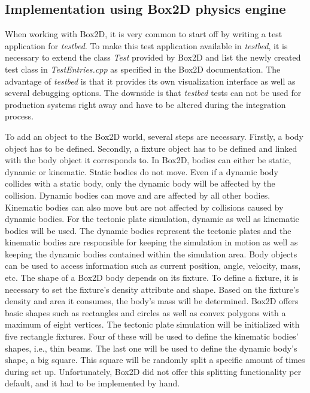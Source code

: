 \documentclass[11pt,a4paper,twoside,openright]{report}
\begin{document}
\subsection{Implementation using Box2D physics engine}
\label{subsec:implbox2d}
When working with Box2D, it is very common to start off by writing a test application for \emph{testbed}. To make this test application available in \emph{testbed}, it is necessary to extend the class \emph{Test} provided by Box2D and list the newly created test class in \emph{TestEntries.cpp} as specified in the Box2D documentation. The advantage of \emph{testbed} is that it provides its own visualization interface as well as several debugging options. The downside is that \emph{testbed} tests can not be used for production systems right away and have to be altered during the integration process.

To add an object to the Box2D world, several steps are necessary. Firstly, a body object has to be defined. Secondly, a fixture object has to be defined and linked with the body object it corresponds to. In Box2D, bodies can either be static, dynamic or kinematic. Static bodies do not move. Even if a dynamic body collides with a static body, only the dynamic body will be affected by the collision. Dynamic bodies can move and are affected by all other bodies. Kinematic bodies can also move but are not affected by collisions caused by dynamic bodies. For the tectonic plate simulation, dynamic as well as kinematic bodies will be used. The dynamic bodies represent the tectonic plates and the kinematic bodies are responsible for keeping the simulation in motion as well as keeping the dynamic bodies contained within the simulation area. Body objects can be used to access information such as current position, angle, velocity, mass, etc. The shape of a Box2D body depends on its fixture. To define a fixture, it is necessary to set the fixture's density attribute and shape. Based on the fixture's density and area it consumes, the body's mass will be determined. Box2D offers basic shapes such as rectangles and circles as well as convex polygons with a maximum of eight vertices. The tectonic plate simulation will be initialized with five rectangle fixtures. Four of these will be used to define the kinematic bodies' shapes, i.e., thin beams. The last one will be used to define the dynamic body's shape, a big square. This square will be randomly split a specific amount of times during set up. Unfortunately, Box2D did not offer this splitting functionality per default, and it had to be implemented by hand.
\end{document}
